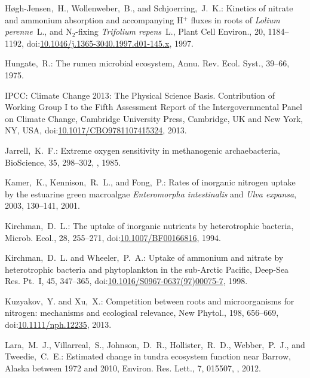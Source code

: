 \documentclass[gmd,noline]{copernicus}
\begin{document}
\begin{thebibliography}{55}
H{\o}gh-Jensen,~H., Wollenweber,~B., and Schjoerring,~J.~K.: Kinetics of
nitrate and ammonium absorption and accompanying H$^+$ fluxes in roots of
\textit{Lolium perenne}~L., and N$_2$-fixing \textit{Trifolium repens}~L.,
Plant Cell Environ., 20, 1184--1192,
doi:\href{http://dx.doi.org/10.1046/j.1365-3040.1997.d01-145.x}{10.1046/j.1365-3040.1997.d01-145.x},
1997.

Hungate,~R.: The rumen microbial ecosystem, Annu. Rev. Ecol. Syst., 39--66,
1975.


IPCC:
Climate Change 2013: The Physical Science Basis. Contribution of Working Group I to the Fifth Assessment Report of the Intergovernmental Panel on Climate Change,
Cambridge University Press, Cambridge, UK and New York, NY, USA,
doi:\href{http://dx.doi.org/10.1017/CBO9781107415324}{10.1017/CBO9781107415324}, 2013.


Jarrell,~K.~F.:
Extreme oxygen sensitivity in methanogenic archaebacteria,
BioScience,
35, 298--302,
 , 1985.

Kamer,~K., Kennison,~R.~L., and Fong,~P.:
Rates of inorganic nitrogen uptake by the estuarine green macroalgae \textit{Enteromorpha intestinalis} and \textit{Ulva expansa},
2003, 130--141, 2001.


Kirchman,~D.~L.:
The uptake of inorganic nutrients by heterotrophic bacteria,
Microb. Ecol.,
28, 255--271,
doi:\href{http://dx.doi.org/10.1007/BF00166816}{10.1007/BF00166816}, 1994.


Kirchman,~D.~L. and Wheeler,~P.~A.:
Uptake of ammonium and nitrate by heterotrophic bacteria and phytoplankton in the sub-Arctic Pacific,
Deep-Sea Res. Pt.~I,
45, 347--365,
doi:\href{http://dx.doi.org/10.1016/S0967-0637(97)00075-7}{10.1016/S0967-0637(97)00075-7}, 1998.


Kuzyakov,~Y. and Xu,~X.:
Competition between roots and microorganisms for nitrogen: mechanisms and ecological relevance,
New Phytol.,
198, 656--669,
doi:\href{http://dx.doi.org/10.1111/nph.12235}{10.1111/nph.12235}, 2013.


Lara,~M.~J., Villarreal,~S., Johnson,~D.~R., Hollister,~R.~D., Webber,~P.~J., and Tweedie,~C.~E.:
Estimated change in tundra ecosystem function near Barrow, Alaska between 1972 and 2010,
Environ. Res. Lett.,
7, 015507, , 2012.



\end{thebibliography}
\end{document}
